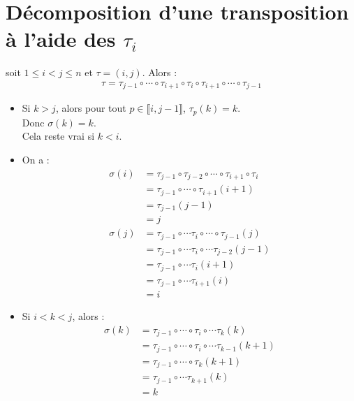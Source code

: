 \documentclass[../main.tex]{subfiles}
\begin{document}
\section{Décomposition d'une transposition à l'aide des $\tau_i$}
\begin{tcolorbox}[title=Propostion 29.35, title filled=false, colframe=lightblue, colback=lightblue!10!white]
    soit $1\leq i < j\leq n$ et $\tau = (i, j)$. Alors : 
    \begin{align*}
        \tau = \tau_{j-1} \circ \cdots \circ \tau_{i+1} \circ \tau_i \circ \tau_{i+1} \circ \cdots \circ \tau_{j-1}
    \end{align*}
\end{tcolorbox}

\begin{itemize}
    \item Si $k>j$, alors pour tout $p\in \llbracket i, j-1 \rrbracket$, $\tau_p(k) = k$. \\
    Donc $\sigma(k) = k$. \\
    Cela reste vrai si $k < i$. 
    \item On a :
    \begin{align*} 
        \sigma(i) &= \tau_{j-1}\circ \tau_{j-2} \circ \cdots \circ \tau_{i+1} \circ \tau_i \\
        &= \tau_{j-1}\circ \cdots \circ \tau_{i+1}(i+1) \\
        &= \tau_{j-1}(j-1) \\
        &= j \\
        \sigma(j) &= \tau_{j-1}\circ\cdots\tau_i\circ\cdots\circ\tau_{j-1}(j) \\
        &= \tau_{j-1}\circ\cdots\tau_i\circ\cdots\tau_{j-2}(j-1) \\
        &= \tau_{j-1}\circ\cdots\tau_i(i+1) \\
        &= \tau_{j-1}\circ\cdots\tau_{i+1}(i) \\
        &= i
    \end{align*}
    \item Si $i < k < j$, alors : 
    \begin{align*}
        \sigma(k) &= \tau_{j-1}\circ\cdots\circ\tau_i\circ\cdots\tau_k(k) \\
        &= \tau_{j-1}\circ\cdots\circ\tau_i\circ\cdots\tau_{k-1}(k+1) \\
        &= \tau_{j-1}\circ\cdots\circ\tau_k(k+1) \\
        &= \tau_{j-1}\circ\cdots\tau_{k+1}(k) \\
        &= k
    \end{align*}
\end{itemize}
\end{document}

